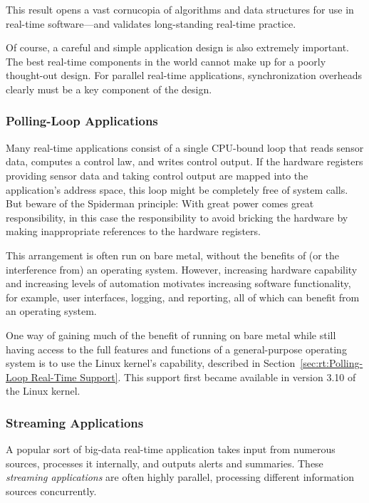 This result opens a vast cornucopia of algorithms and data structures
for use in real-time software---and validates long-standing real-time practice.

Of course, a careful and simple application design is also extremely
important.
The best real-time components in the world cannot make up for a
poorly thought-out design.
For parallel real-time applications, synchronization overheads clearly
must be a key component of the design.

\subsubsection{Polling-Loop Applications}
\label{sec:rt:Polling-Loop Applications}

Many real-time applications consist of a single CPU-bound loop that
reads sensor data, computes a control law, and writes control output.
If the hardware registers providing sensor data and taking control
output are mapped into the application's address space, this loop
might be completely free of system calls.
But beware of the Spiderman principle: With great power comes great
responsibility, in this case the responsibility to avoid bricking the
hardware by making inappropriate references to the hardware registers.

This arrangement is often run on bare metal, without the benefits of
(or the interference from) an operating system.
However, increasing hardware capability and increasing levels of
automation motivates increasing software functionality, for example,
user interfaces, logging, and reporting, all of which can benefit from
an operating system.

One way of gaining much of the benefit of running on bare metal while
still having access to the full features and functions of a
general-purpose operating system is to use the Linux kernel's
 capability, described in
Section~\ref{sec:rt:Polling-Loop Real-Time Support}.
This support first became available in version 3.10 of the Linux kernel.

\subsubsection{Streaming Applications}
\label{sec:rt:Streaming Applications}

A popular sort of big-data real-time application takes input from numerous
sources, processes it internally, and outputs alerts and summaries.
These \emph{streaming applications} are often highly parallel, processing
different information sources concurrently.

